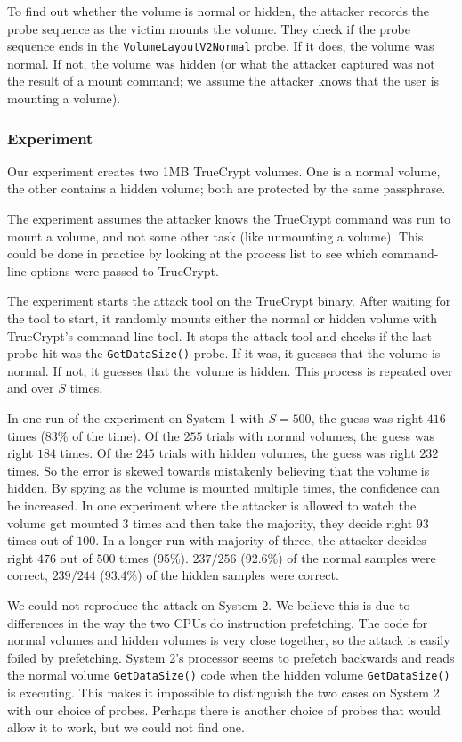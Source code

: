 \documentclass[letterpaper,twocolumn,10pt]{article}
\begin{document}
To find out whether the volume is normal or hidden, the attacker records the
probe sequence as the victim mounts the volume. They check if the probe sequence
ends in the \texttt{VolumeLayoutV2Normal} probe. If it does, the volume was
normal. If not, the volume was hidden (or what the attacker captured was not the
result of a mount command; we assume the attacker knows that the user is
mounting a volume).

\subsubsection{Experiment}

Our experiment creates two 1MB TrueCrypt volumes. One is a normal volume, the
other contains a hidden volume; both are protected by the same passphrase.

The experiment assumes the attacker knows the TrueCrypt command was run to mount
a volume, and not some other task (like unmounting a volume). This could be done
in practice by looking at the process list to see which command-line options
were passed to TrueCrypt.

The experiment starts the attack tool on the TrueCrypt binary. After waiting for
the tool to start, it randomly mounts either the normal or hidden volume with
TrueCrypt's command-line tool. It stops the attack tool and checks if the last
probe hit was the \texttt{GetDataSize()} probe. If it was, it guesses that the
volume is normal. If not, it guesses that the volume is hidden. This process is
repeated over and over $S$ times.

In one run of the experiment on System 1 with $S=500$,
the guess was right $416$ times (83\% of the time). Of the $255$ trials with
normal volumes, the guess was right $184$ times. Of the $245$ trials with hidden
volumes, the guess was right $232$ times. So the error is skewed towards
mistakenly believing that the volume is hidden. By spying as the volume is
mounted multiple times, the confidence can be increased. In one
experiment where the attacker is allowed to watch the
volume get mounted 3 times and then take the majority, they decide right $93$
times out of $100$. In a longer run with
majority-of-three, the attacker decides right $476$ out of $500$ times (95\%).
$237/256$ (92.6\%) of the normal samples were correct, $239/244$ (93.4\%) of the
hidden samples were correct.

We could not reproduce the attack on System 2. We believe this is due to
differences in the way the two CPUs do instruction prefetching. The code for
normal volumes and hidden volumes is very close together, so the attack is
easily foiled by prefetching. System 2's processor seems to prefetch backwards
and reads the normal volume \texttt{GetDataSize()} code when the hidden volume
\texttt{GetDataSize()} is executing. This makes it impossible to distinguish the
two cases on System 2 with our choice of probes. Perhaps there is another choice
of probes that would allow it to work, but we could not find one.
\end{document}
